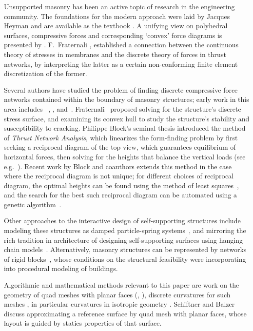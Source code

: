 \documentclass[annual]{acmsiggraph}
\begin{document}
Unsupported masonry has been an active topic of research in the 
engineering community. The foundations for the modern approach were laid 
by Jacques Heyman  and are available as the textbook 
\cite{Heyman95}. A unifying view on polyhedral surfaces, compressive 
forces and corresponding `convex' force diagrams is presented by 
\cite{Ash1988}. F.~Fraternali , 
 established a connection between the continuous 
theory of stresses in membranes and the discrete theory of forces in 
thrust networks, by interpreting the latter as a certain non-conforming finite 
element discretization of the former.

Several authors have studied the problem of finding discrete compressive 
force networks contained within the boundary of masonry structures; early 
work in this area includes \ \cite{schek74}, \cite{Livesley92}, and\ 
\cite{O'Dwyer98}. Fraternali~ proposed solving 
for the structure's discrete stress surface, and examining its convex hull 
to study the structure's stability and susceptibility to cracking. 
Philippe Block's seminal thesis introduced the method 
of {\it Thrust Network Analysis}, which linearizes the form-finding problem by 
first seeking a reciprocal diagram of the top view, which guarantees 
equilibrium of horizontal forces, then solving for the heights that 
balance the vertical loads (see e.g.\ \cite{Block07,block09}). Recent work by Block and coauthors extends this 
method in the case where the reciprocal diagram is not unique; for 
different choices of reciprocal diagram, the optimal heights can be found 
using the method of least squares~\cite{vanmele2011}, and the search for 
the best such reciprocal diagram can be automated using a genetic 
algorithm~\cite{Block2011}.

Other approaches to the interactive design of self-supporting structures 
include modeling these structures as damped particle-spring 
systems~\cite{Kilian2005,barnes09}, and mirroring the rich tradition in architecture of 
designing self-supporting surfaces using hanging chain 
models~\cite{Heyman98}. Alternatively, masonry structures can be 
represented by networks of rigid blocks~\cite{Whiting09}, whose conditions 
on the structural feasibility were incorporating into procedural modeling 
of buildings.

Algorithmic and mathematical methods relevant to this paper are work on 
the geometry of quad meshes with planar faces (\cite{Glymph2004}, 
\cite{Liu2006}), discrete curvatures for such meshes \cite{Pottmann2007b}, 
in particular curvatures in isotropic geometry \cite{Pottmann2007}. 
Schiftner and Balzer \shortcite{Schiftner2010} discuss approximating a 
reference surface by quad mesh with planar faces, whose layout is guided 
by statics properties of that surface.
\end{document}
